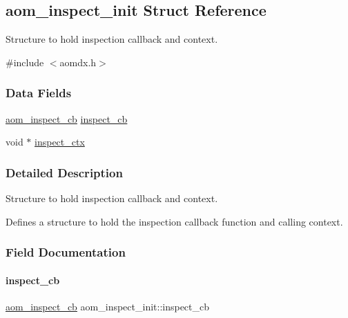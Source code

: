 \hypertarget{structaom__inspect__init}{}\subsection{aom\+\_\+inspect\+\_\+init Struct Reference}
\label{structaom__inspect__init}


Structure to hold inspection callback and context.  




{\ttfamily \#include $<$aomdx.\+h$>$}

\subsubsection*{Data Fields}
\begin{DoxyCompactItemize}
\item 
\hyperlink{group__aom__decoder_ga1b37b4b76004e5a2776c2e2f16b052cd}{aom\+\_\+inspect\+\_\+cb} \hyperlink{structaom__inspect__init_a3a51c5f8c524cec7564fae85e047750b}{inspect\+\_\+cb}
\item 
void $\ast$ \hyperlink{structaom__inspect__init_a26c618c754d4b278fb636353e6b9d96d}{inspect\+\_\+ctx}
\end{DoxyCompactItemize}


\subsubsection{Detailed Description}
Structure to hold inspection callback and context. 

Defines a structure to hold the inspection callback function and calling context. 

\subsubsection{Field Documentation}
\mbox{\label{structaom__inspect__init_a3a51c5f8c524cec7564fae85e047750b}} 
\paragraph{\texorpdfstring{inspect\+\_\+cb}{inspect\_cb}}
{\footnotesize\ttfamily \hyperlink{group__aom__decoder_ga1b37b4b76004e5a2776c2e2f16b052cd}{aom\+\_\+inspect\+\_\+cb} aom\+\_\+inspect\+\_\+init\+::inspect\+\_\+cb}

